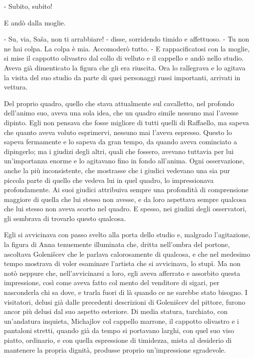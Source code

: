 - Subito, subito! 

E andò dalla moglie. 

- Su, via, Saša, non ti arrabbiare! - disse, sorridendo timido e affettuoso. - Tu non ne hai colpa. La colpa è mia. Accomoderò tutto. - E rappacificatosi con la moglie, si mise il cappotto olivastro dal collo di velluto e il cappello e andò nello studio. Aveva già dimenticato la figura che gli era riuscita. Ora lo rallegrava e lo agitava la visita del suo studio da parte di quei personaggi russi importanti, arrivati in vettura. 

Del proprio quadro, quello che stava attualmente sul cavalletto, nel profondo dell'animo suo, aveva una sola idea, che un quadro simile nessuno mai l'avesse dipinto. Egli non pensava che fosse migliore di tutti quelli di Raffaello, ma sapeva che quanto aveva voluto esprimervi, nessuno mai l'aveva espresso. Questo lo sapeva fermamente e lo sapeva da gran tempo, da quando aveva cominciato a dipingerlo; ma i giudizi degli altri, quali che fossero, avevano tuttavia per lui un'importanza enorme e lo agitavano fino in fondo all'anima. Ogni osservazione, anche la più inconsistente, che mostrasse che i giudici vedevano una sia pur piccola parte di quello che vedeva lui in quel quadro, lo impressionava profondamente. Ai suoi giudici attribuiva sempre una profondità di comprensione maggiore di quella che lui stesso non avesse, e da loro aspettava sempre qualcosa che lui stesso non aveva scorto nel quadro. E spesso, nei giudizi degli osservatori, gli sembrava di trovarlo questo qualcosa. 

Egli si avvicinava con passo svelto alla porta dello studio e, malgrado l'agitazione, la figura di Anna tenuemente illuminata che, dritta nell'ombra del portone, ascoltava Golenišcev che le parlava calorosamente di qualcosa, e che nel medesimo tempo mostrava di voler esaminare l'artista che si avvicinava, lo stupì. Ma non notò neppure che, nell'avvicinarsi a loro, egli aveva afferrato e assorbito questa impressione, così come aveva fatto col mento del venditore di sigari, per nasconderla chi sa dove, e trarla fuori di là quando ce ne sarebbe stato bisogno. I visitatori, delusi già dalle precedenti descrizioni di Golenišcev del pittore, furono ancor più delusi dal suo aspetto esteriore. Di media statura, tarchiato, con un'andatura inquieta, Michajlov col cappello marrone, il cappotto olivastro e i pantaloni stretti, quando già da tempo si portavano larghi, con quel suo viso piatto, ordinario, e con quella espressione di timidezza, mista al desiderio di mantenere la propria dignità, produsse proprio un'impressione sgradevole. 

